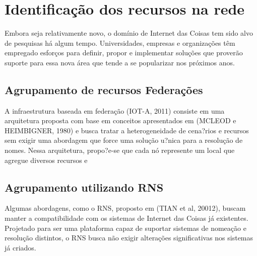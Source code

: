 \section{Identifica\c{c}\~{a}o dos recursos na rede}
	Embora seja relativamente novo, o dom\'{i}nio de Internet das Coisas tem sido alvo de pesquisas h\'{a} algum tempo. Universidades, empresas e organiza\c{c}\~{o}es t\^{e}m empregado esfor\c{c}os para definir, propor e implementar solu\c{c}\~{o}es que prover\~{a}o suporte para essa nova \'{a}rea que tende a se popularizar nos pr\'{o}ximos anos.	
	
\subsection{Agrupamento de recursos Federa\c{c}\~{o}es}
	 A infraestrutura baseada em federa\c{c}\~{a}o (IOT-A, 2011) consiste em uma arquitetura proposta com base em conceitos apresentados em (MCLEOD e HEIMBIGNER, 1980) e busca tratar a heterogeneidade de cena?rios e recursos sem exigir uma abordagem que force uma solu\c{c}\~{a}o u?nica para a resolu\c{c}\~{a}o de nomes. Nessa arquitetura, propo?e-se que cada n\'{o} represente um local que agregue diversos recursos e	

\subsection{Agrupamento utilizando RNS}
	Algumas abordagens, como o RNS, proposto em (TIAN et al, 20012), buscam manter a compatibilidade com os sistemas de Internet das Coisas j\'{a} existentes. Projetado para ser uma plataforma capaz de suportar sistemas de nomea\c{c}\~{a}o e resolu\c{c}\~{a}o distintos, o RNS busca n\~{a}o exigir altera\c{c}\~{o}es significativas nos sistemas j\'{a} criados.
